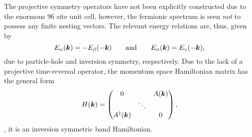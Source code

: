 The projective symmetry operators have not been explicitly constructed due to the enormous 96 site unit cell, however, the fermionic spectrum is seen \textit{not} to possess any finite nesting vectors.
The relevant energy relations are, thus, given by
%
\begin{equation}
	E_{\alpha}(\bm{k}) = -E_{\beta}(-\bm{k}) \qquad {\rm and} \qquad E_{\alpha}(\bm{k}) = E_{\gamma}(-\bm{k}),
\end{equation}
%
due to particle-hole and inversion symmetry, respectively.
Due to the lack of a projective time-reversal operator, the momentum space Hamiltonian matrix has the general form
%
\begin{equation}
	H(\bm{k}) = 
		\begin{pmatrix}
			0			&		 & A(\bm{k}) \\
			& \ddots & 		  \\
			A^{\dagger}(\bm{k})	&		 & 0
		\end{pmatrix},
\end{equation}
%
\ie, it is an inversion symmetric band Hamiltonian.


%
%
